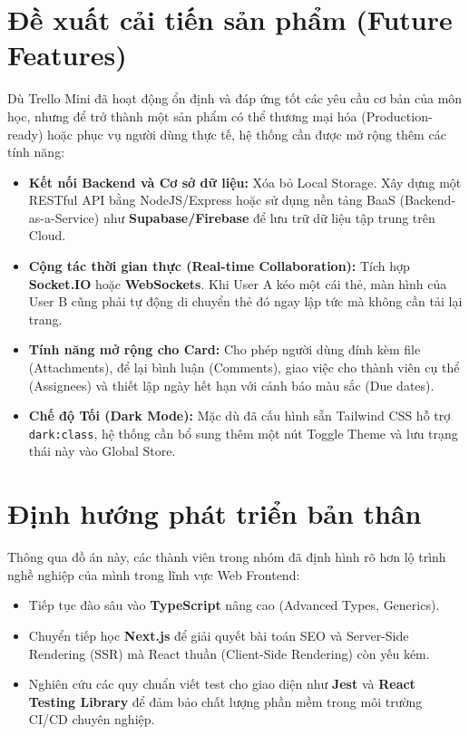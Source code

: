 \section{Đề xuất cải tiến sản phẩm (Future Features)}
Dù Trello Mini đã hoạt động ổn định và đáp ứng tốt các yêu cầu cơ bản của môn học, nhưng để trở thành một sản phẩm có thể thương mại hóa (Production-ready) hoặc phục vụ người dùng thực tế, hệ thống cần được mở rộng thêm các tính năng:
\begin{itemize}
    \item \textbf{Kết nối Backend và Cơ sở dữ liệu:} Xóa bỏ Local Storage. Xây dựng một RESTful API bằng NodeJS/Express hoặc sử dụng nền tảng BaaS (Backend-as-a-Service) như \textbf{Supabase/Firebase} để lưu trữ dữ liệu tập trung trên Cloud.
    \item \textbf{Cộng tác thời gian thực (Real-time Collaboration):} Tích hợp \textbf{Socket.IO} hoặc \textbf{WebSockets}. Khi User A kéo một cái thẻ, màn hình của User B cũng phải tự động di chuyển thẻ đó ngay lập tức mà không cần tải lại trang.
    \item \textbf{Tính năng mở rộng cho Card:} Cho phép người dùng đính kèm file (Attachments), để lại bình luận (Comments), giao việc cho thành viên cụ thể (Assignees) và thiết lập ngày hết hạn với cảnh báo màu sắc (Due dates).
    \item \textbf{Chế độ Tối (Dark Mode):} Mặc dù đã cấu hình sẵn Tailwind CSS hỗ trợ \texttt{dark:class}, hệ thống cần bổ sung thêm một nút Toggle Theme và lưu trạng thái này vào Global Store.
\end{itemize}

\section{Định hướng phát triển bản thân}
Thông qua đồ án này, các thành viên trong nhóm đã định hình rõ hơn lộ trình nghề nghiệp của mình trong lĩnh vực Web Frontend:
\begin{itemize}
    \item Tiếp tục đào sâu vào \textbf{TypeScript} nâng cao (Advanced Types, Generics).
    \item Chuyển tiếp học \textbf{Next.js} để giải quyết bài toán SEO và Server-Side Rendering (SSR) mà React thuần (Client-Side Rendering) còn yếu kém.
    \item Nghiên cứu các quy chuẩn viết test cho giao diện như \textbf{Jest} và \textbf{React Testing Library} để đảm bảo chất lượng phần mềm trong môi trường CI/CD chuyên nghiệp.
\end{itemize}
